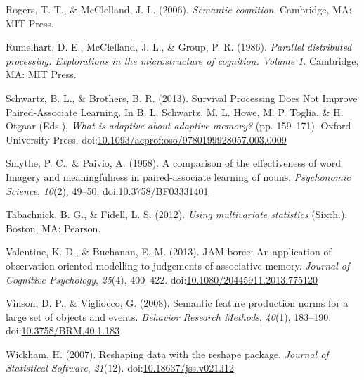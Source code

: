 \documentclass[english,,man]{apa6}
\begin{document}
\leavevmode\hypertarget{ref-Rogers2006}{}%
Rogers, T. T., \& McClelland, J. L. (2006). \emph{Semantic cognition}. Cambridge, MA: MIT Press.

\leavevmode\hypertarget{ref-Rumelhart1986}{}%
Rumelhart, D. E., McClelland, J. L., \& Group, P. R. (1986). \emph{Parallel distributed processing: Explorations in the microstructure of cognition. Volume 1}. Cambridge, MA: MIT Press.

\leavevmode\hypertarget{ref-Schwartz2013}{}%
Schwartz, B. L., \& Brothers, B. R. (2013). Survival Processing Does Not Improve Paired-Associate Learning. In B. L. Schwartz, M. L. Howe, M. P. Toglia, \& H. Otgaar (Eds.), \emph{What is adaptive about adaptive memory?} (pp. 159--171). Oxford University Press. doi:\href{https://doi.org/10.1093/acprof:oso/9780199928057.003.0009}{10.1093/acprof:oso/9780199928057.003.0009}

\leavevmode\hypertarget{ref-Smythe1968}{}%
Smythe, P. C., \& Paivio, A. (1968). A comparison of the effectiveness of word Imagery and meaningfulness in paired-associate learning of nouns. \emph{Psychonomic Science}, \emph{10}(2), 49--50. doi:\href{https://doi.org/10.3758/BF03331401}{10.3758/BF03331401}

\leavevmode\hypertarget{ref-Tabachnick2012}{}%
Tabachnick, B. G., \& Fidell, L. S. (2012). \emph{Using multivariate statistics} (Sixth.). Boston, MA: Pearson.

\leavevmode\hypertarget{ref-Valentine2013}{}%
Valentine, K. D., \& Buchanan, E. M. (2013). JAM-boree: An application of observation oriented modelling to judgements of associative memory. \emph{Journal of Cognitive Psychology}, \emph{25}(4), 400--422. doi:\href{https://doi.org/10.1080/20445911.2013.775120}{10.1080/20445911.2013.775120}

\leavevmode\hypertarget{ref-Vinson2008}{}%
Vinson, D. P., \& Vigliocco, G. (2008). Semantic feature production norms for a large set of objects and events. \emph{Behavior Research Methods}, \emph{40}(1), 183--190. doi:\href{https://doi.org/10.3758/BRM.40.1.183}{10.3758/BRM.40.1.183}

\leavevmode\hypertarget{ref-Wickham2007}{}%
Wickham, H. (2007). Reshaping data with the reshape package. \emph{Journal of Statistical Software}, \emph{21}(12). doi:\href{https://doi.org/10.18637/jss.v021.i12}{10.18637/jss.v021.i12}
\end{document}

